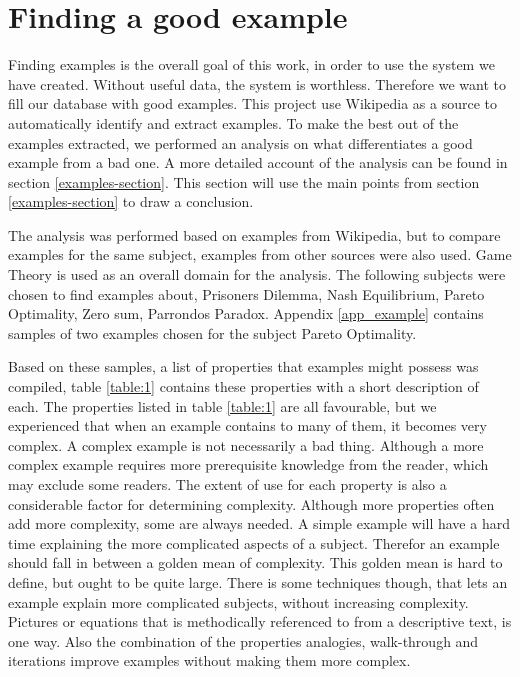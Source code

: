 \section{Finding a good example}
Finding examples is the overall goal of this work, in order to use the system we have created. Without useful data, the system is worthless. Therefore we want to fill our database with good examples. This project use Wikipedia as a source to automatically identify and extract examples. To make the best out of the examples extracted, we performed an analysis on what differentiates a good example from a bad one. A more detailed account of the analysis can be found in section \ref{examples-section}. This section will use the main points from section \ref{examples-section} to draw a conclusion.

The analysis was performed based on examples from Wikipedia, but to compare examples for the same subject, examples from other sources were also used. Game Theory is used as an overall domain for the analysis. The following subjects were chosen to find examples about, Prisoners Dilemma, Nash Equilibrium, Pareto Optimality, Zero sum, Parrondos Paradox. Appendix \ref{app_example} contains samples of two examples chosen for the subject Pareto Optimality. 

Based on these samples, a list of properties that examples might possess was compiled, table \ref{table:1} contains these properties with a short description of each. The properties listed in table \ref{table:1} are all favourable, but we experienced that when an example contains to many of them, it becomes very complex. A complex example is not necessarily a bad thing. Although a more complex example requires more prerequisite knowledge from the reader, which may exclude some readers. The extent of use for each property is also a considerable factor for determining complexity. Although more properties often add more complexity, some are always needed. A simple example will have a hard time explaining the more complicated aspects of a subject. Therefor an example should fall in between a golden mean of complexity. This golden mean is hard to define, but ought to be quite large. There is some techniques though, that lets an example explain more complicated subjects, without increasing complexity. Pictures or equations that is methodically referenced to from a descriptive text, is one way. Also the combination of the properties analogies, walk-through and iterations improve examples without making them more complex. 

